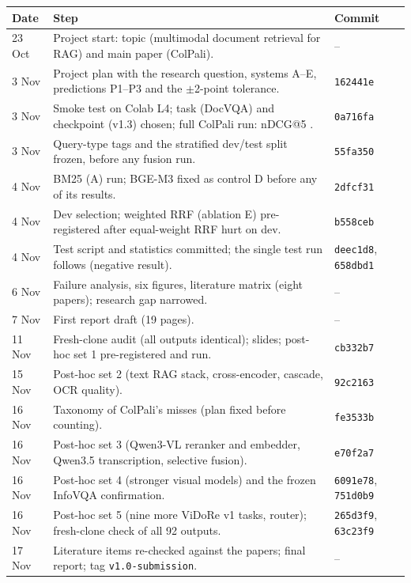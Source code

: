 \documentclass[11pt,a4paper]{article}
\begin{document}
\begin{center}\footnotesize\setlength{\tabcolsep}{4pt}
\begin{tabular}{l p{9.6cm} l}
\toprule
Date & Step & Commit \\
\midrule
23 Oct & Project start: topic (multimodal document retrieval for RAG) and main paper (ColPali). & -- \\
3 Nov & Project plan with the research question, systems A--E, predictions P1--P3 and the $\pm$2-point tolerance. & \texttt{162441e} \\
3 Nov & Smoke test on Colab L4; task (DocVQA) and checkpoint (v1.3) chosen; full ColPali run: nDCG@5 \fullB{}. & \texttt{0a716fa} \\
3 Nov & Query-type tags and the stratified dev/test split frozen, before any fusion run. & \texttt{55fa350} \\
4 Nov & BM25 (A) run; BGE-M3 fixed as control D before any of its results. & \texttt{2dfcf31} \\
4 Nov & Dev selection; weighted RRF (ablation E) pre-registered after equal-weight RRF hurt on dev. & \texttt{b558ceb} \\
4 Nov & Test script and statistics committed; the single test run follows (negative result). & \texttt{deec1d8}, \texttt{658dbd1} \\
6 Nov & Failure analysis, six figures, literature matrix (eight papers); research gap narrowed. & -- \\
7 Nov & First report draft (19 pages). & -- \\
11 Nov & Fresh-clone audit (all outputs identical); slides; post-hoc set 1 pre-registered and run. & \texttt{cb332b7} \\
15 Nov & Post-hoc set 2 (text RAG stack, cross-encoder, cascade, OCR quality). & \texttt{92c2163} \\
16 Nov & Taxonomy of ColPali's misses (plan fixed before counting). & \texttt{fe3533b} \\
16 Nov & Post-hoc set 3 (Qwen3-VL reranker and embedder, Qwen3.5 transcription, selective fusion). & \texttt{e70f2a7} \\
16 Nov & Post-hoc set 4 (stronger visual models) and the frozen InfoVQA confirmation. & \texttt{6091e78}, \texttt{751d0b9} \\
16 Nov & Post-hoc set 5 (nine more ViDoRe v1 tasks, router); fresh-clone check of all 92 outputs. & \texttt{265d3f9}, \texttt{63c23f9} \\
17 Nov & Literature items re-checked against the papers; final report; tag \texttt{v1.0-submission}. & -- \\
\bottomrule
\end{tabular}
\end{center}
\end{document}
